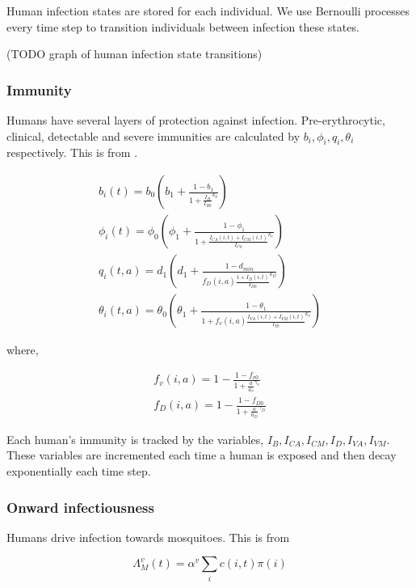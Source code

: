 \documentclass{bmcart}
\begin{document}
Human infection states are stored for each individual. We use Bernoulli processes every time step to transition individuals between infection these states.

(TODO graph of human infection state transitions)

\subsubsection*{Immunity}

Humans have several layers of protection against infection. Pre-erythrocytic, clinical, detectable and severe immunities are calculated by $b_i, \phi_i, q_i, \theta_i$ respectively. This is from \cite{griffin_reducing_2010}.

\begin{gather*}
b_i(t) = b_0 \left( b_1 + \frac{1 - b_1}{1 + \frac{I_B}{I_{B0}}^{k_b}} \right)\\
\phi_i(t) = \phi_0 \left( \phi_1 + \frac{1 - \phi_1}{1 + \frac{I_{CA}(i, t) + I_{CM}(i, t)}{I_{C0}}^{k_c}} \right) \\
q_i(t, a) = d_1 \left( d_1 + \frac{1 - d_{min}}{f_D(i, a)\frac{1 + I_D(i, t)}{I_{D0}}^{k_D}} \right) \\
\theta_i(t, a) = \theta_0 \left( \theta_1 + \frac{1 - \theta_1}{1 + f_v(i, a)\frac{I_{VA}(i, t) + I_{VM}(i, t)}{I_{V0}}^{k_v}} \right)
\end{gather*}

where,

\begin{gather*}
f_v(i, a) = 1 - \frac{1 - f_{v0}}{1 + \frac{a}{a_v}^{\gamma_v}} \\
f_D(i, a) = 1 - \frac{1 - f_{D0}}{1 + \frac{a}{a_D}^{\gamma_D}}
\end{gather*}

Each human's immunity is tracked by the variables, $I_B, I_{CA}, I_{CM}, I_D, I_{VA}, I_{VM}$. These variables are incremented each time a human is exposed and then decay exponentially each time step.

\subsubsection*{Onward infectiousness}

Humans drive infection towards mosquitoes. This is from \cite{griffin_reducing_2010}

\[
\Lambda^v_M(t) = \alpha^v \sum_i c(i, t) \pi(i)
\]
\end{document}
